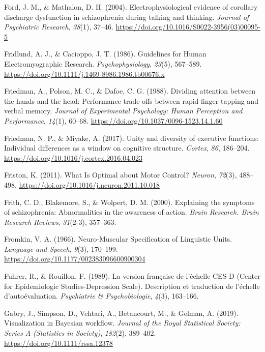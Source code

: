 \documentclass[a4paper,12pt,twoside,openright,oldfontcommands]{memoir}
\begin{document}
\leavevmode\hypertarget{ref-ford_electrophysiological_2004}{}%
Ford, J. M., \& Mathalon, D. H. (2004). Electrophysiological evidence of corollary discharge dysfunction in schizophrenia during talking and thinking. \emph{Journal of Psychiatric Research}, \emph{38}(1), 37--46. \url{https://doi.org/10.1016/S0022-3956(03)00095-5}

\leavevmode\hypertarget{ref-fridlund_guidelines_1986}{}%
Fridlund, A. J., \& Cacioppo, J. T. (1986). Guidelines for Human Electromyographic Research. \emph{Psychophysiology}, \emph{23}(5), 567--589. \url{https://doi.org/10.1111/j.1469-8986.1986.tb00676.x}

\leavevmode\hypertarget{ref-friedman_dividing_1988}{}%
Friedman, A., Polson, M. C., \& Dafoe, C. G. (1988). Dividing attention between the hands and the head: Performance trade-offs between rapid finger tapping and verbal memory. \emph{Journal of Experimental Psychology: Human Perception and Performance}, \emph{14}(1), 60--68. \url{https://doi.org/10.1037/0096-1523.14.1.60}

\leavevmode\hypertarget{ref-friedman_unity_2017}{}%
Friedman, N. P., \& Miyake, A. (2017). Unity and diversity of executive functions: Individual differences as a window on cognitive structure. \emph{Cortex}, \emph{86}, 186--204. \url{https://doi.org/10.1016/j.cortex.2016.04.023}

\leavevmode\hypertarget{ref-friston_what_2011}{}%
Friston, K. (2011). What Is Optimal about Motor Control? \emph{Neuron}, \emph{72}(3), 488--498. \url{https://doi.org/10.1016/j.neuron.2011.10.018}

\leavevmode\hypertarget{ref-frith_explaining_2000}{}%
Frith, C. D., Blakemore, S., \& Wolpert, D. M. (2000). Explaining the symptoms of schizophrenia: Abnormalities in the awareness of action. \emph{Brain Research. Brain Research Reviews}, \emph{31}(2-3), 357--363.

\leavevmode\hypertarget{ref-fromkin_neuro-muscular_1966}{}%
Fromkin, V. A. (1966). Neuro-Muscular Specification of Linguistic Units. \emph{Language and Speech}, \emph{9}(3), 170--199. \url{https://doi.org/10.1177/002383096600900304}

\leavevmode\hypertarget{ref-fuhrer_version_1989}{}%
Fuhrer, R., \& Rouillon, F. (1989). La version française de l'échelle CES-D (Center for Epidemiologic Studies-Depression Scale). Description et traduction de l'échelle d'autoévaluation. \emph{Psychiatrie \& Psychobiologie}, \emph{4}(3), 163--166.

\leavevmode\hypertarget{ref-gabry_visualization_2019}{}%
Gabry, J., Simpson, D., Vehtari, A., Betancourt, M., \& Gelman, A. (2019). Visualization in Bayesian workflow. \emph{Journal of the Royal Statistical Society: Series A (Statistics in Society)}, \emph{182}(2), 389--402. \url{https://doi.org/10.1111/rssa.12378}
\end{document}
